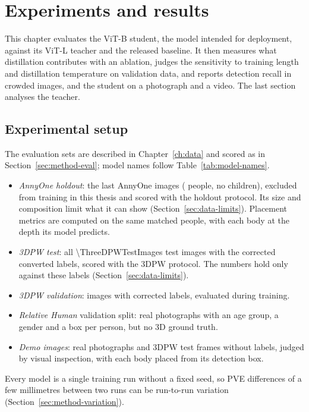 
\chapter{Experiments and results}
\label{ch:results}

This chapter evaluates the ViT-B student, the model intended for deployment, against its ViT-L teacher and the
released baseline. It then measures what distillation contributes with an ablation, judges the sensitivity to
training length and distillation temperature on validation data, and reports detection recall in
crowded images, and the student on a photograph and a video. The last section analyses the teacher.

\section{Experimental setup}
\label{sec:res-setup}

The evaluation sets are described in Chapter~\ref{ch:data} and scored as in Section~\ref{sec:method-eval}; model
names follow Table~\ref{tab:model-names}.
\begin{itemize}
\item \emph{AnnyOne holdout}: the last \MethodHoldoutN{} AnnyOne images (\MethodHoldoutPeople{} people, no
  children), excluded from training in this thesis and scored with the holdout protocol. Its size and composition
  limit what it can show (Section~\ref{sec:data-limits}). Placement metrics are computed on the same matched people,
  with each body at the depth its model predicts.
\item \emph{3DPW test}: all \num{\ThreeDPWTestImages} test images with the corrected converted labels, scored with
  the 3DPW protocol. The numbers hold only against these labels (Section~\ref{sec:data-limits}).
\item \emph{3DPW validation}: \SelValImages{} images with corrected labels, evaluated during training.
\item \emph{Relative Human} validation split: real photographs with an age group, a gender and a box per person, but
  no 3D ground truth.
\item \emph{Demo images}: \MethodDemoPhotos{} real photographs and \MethodDemoFrames{} 3DPW test frames without
  labels, judged by visual inspection, with each body placed from its detection box.
\end{itemize}
Every model is a single training run without a fixed seed, so PVE differences of a few millimetres between two
runs can be run-to-run variation (Section~\ref{sec:method-variation}).

